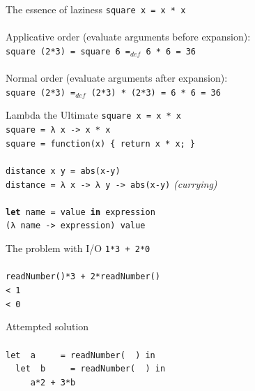 \documentclass{beamer}
\begin{document}
\begin{frame}{The essence of laziness}
  \texttt{square x = x * x} \\ \pause
  \ \\
  Applicative order (evaluate arguments before expansion): \\ \pause
  \texttt{square (2*3) \pause = square 6 \pause =$_{def}$ 6 * 6 \pause = 36} \\ \pause
  \ \\
  Normal order (evaluate arguments after expansion): \\ \pause
  \texttt{square (2*3) \pause =$_{def}$ (2*3) * (2*3) \pause = 6 * 6 \pause = 36}
\end{frame}

\begin{frame}{Lambda the Ultimate}
  \texttt{square x = x * x} \\ \pause
  \texttt{square = λ x -> x * x} \\ \pause
  \texttt{square = function(x) \{ return x * x; \} } \\ \pause
  \ \\
  \texttt{distance x y = abs(x-y)} \\ \pause
  \texttt{distance = λ x -> λ y -> abs(x-y)} \textit{(currying)} \\ \pause
  \ \\
  \texttt{\textbf{let} name = value \textbf{in} expression} \\ \pause
  \texttt{(λ name -> expression) value}
\end{frame}

\begin{frame}{The problem with I/O}
  \texttt{1*3 + 2*0} \\ \pause
  \ \\
  \texttt{readNumber()*3 + 2*readNumber()} \\ \pause
  \texttt{\phantom{}< 1} \\
  \texttt{\phantom{}< 0} \\
\end{frame}

\begin{frame}{Attempted solution}
  \texttt{ \\ \ \\
    let \ a\ \ \ \ \  = readNumber(\ \ ) in \\ \pause
    \ \ let \ b\ \ \ \ \ = readNumber(\ \ ) in \\ \pause
    \ \ \ \ \ a*2 + 3*b
  } \\ \ \\ \ \\ \ 
\end{frame}
\end{document}
